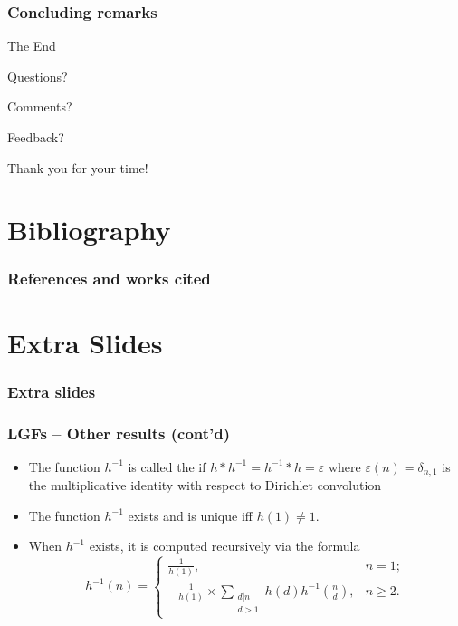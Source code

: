 \begin{frame}
\frametitle{Concluding remarks} 

     \Huge{\centerline{The End}}\smallskip
     \Large{\centerline{Questions?}}\smallskip
     \Large{\centerline{Comments?}}\smallskip
     \Large{\centerline{Feedback?}}\bigskip
     \Huge{\centerline{Thank you for your time!}} 

\end{frame}

\section{Bibliography} 

\begin{frame}[t,allowframebreaks] 
\renewcommand{\refname}{References and works cited} 
\frametitle{\refname} 

\scriptsize 

{}

\end{frame} 

\section{Extra Slides}

\begin{frame}[fragile]
\frametitle{Extra slides}


\end{frame}

\begin{frame}
\frametitle{LGFs -- Other results (cont'd)}
\begin{itemize} 

\item The function $h^{-1}$ is called the  if 
	$h \ast h^{-1} = h^{-1} \ast h = \varepsilon$ where $\varepsilon(n) = \delta_{n,1}$ 
	is the multiplicative identity with respect to Dirichlet convolution
\pause\item The function $h^{-1}$ exists and is unique iff $h(1) \neq 1$. 
\pause\item When $h^{-1}$ exists, it is computed recursively via the formula 
      \[
      h^{-1}(n) = \begin{cases} 
           \frac{1}{h(1)}, & n = 1; \\ 
           -\frac{1}{h(1)} \times 
           \sum\limits_{\substack{d|n \\ d>1}} h(d) h^{-1}\left(\frac{n}{d}\right), & n \geq 2. 
           \end{cases}
      \]

\end{itemize}

\end{frame}

